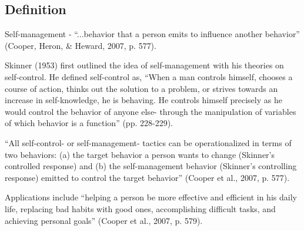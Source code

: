 \subsection{Definition}
Self-management - ``...behavior that a person emits to influence another behavior'' (Cooper, Heron, \& Heward, 2007, p. 577).

Skinner (1953) first outlined the idea of self-management with his theories on self-control. He defined self-control as, ``When a man controls himself, chooses a course of action, thinks out the solution to a problem, or strives towards an increase in self-knowledge, he is behaving. He controls himself precisely as he would control the behavior of anyone else- through the manipulation of variables of which behavior is a function'' (pp. 228-229).

``All self-control- or self-management- tactics can be operationalized in terms of two behaviors: (a) the target behavior a person wants to change (Skinner's controlled response) and (b) the self-management behavior (Skinner's controlling response) emitted to control the target behavior'' (Cooper et al., 2007, p. 577).

Applications include ``helping a person be more effective and efficient in his daily life, replacing bad habits with good ones, accomplishing difficult tasks, and achieving personal goals'' (Cooper et al., 2007, p. 579).
%
